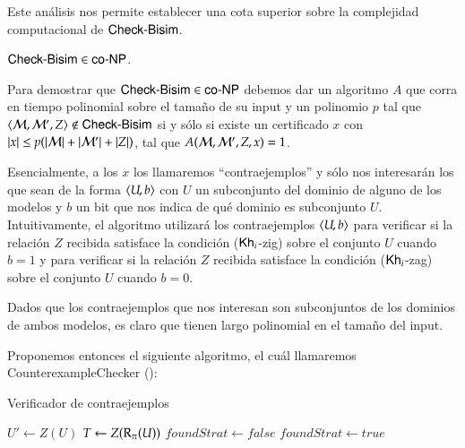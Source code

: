 Este análisis nos permite establecer una cota superior sobre la complejidad computacional de $\rm\textsf{Check-Bisim}$.

\begin{lema}\label{lema:cbisim-in-conp}
    $\rm\textsf{Check-Bisim} \in \rm\textsf{co-NP}$. 
\end{lema}

\begin{demostracion}
    Para demostrar que $\rm\textsf{Check-Bisim} \in \rm\textsf{co-NP}$ debemos dar un algoritmo $A$ que corra en tiempo polinomial sobre el tamaño de su input 
    y un polinomio $p$ tal que $\langle \mathcal{M},\mathcal{M}',Z \rangle \not\in \rm\textsf{Check-Bisim}$ si y sólo si existe un 
    certificado $x$ con $|x| \le p(|\mathcal{M}|+|\mathcal{M}'|+|Z|)$, tal que $A(\mathcal{M},\mathcal{M}',Z,x) = 1$. 
    
    Esencialmente, a los $x$ los llamaremos ``contraejemplos'' y sólo nos interesarán los que sean de la forma $\langle U,b \rangle$ con $U$ un 
    subconjunto del dominio de alguno de los modelos y $b$ un bit que nos indica de qué dominio es subconjunto $U$. 
    Intuitivamente, el algoritmo utilizará los contraejemplos $\langle U,b \rangle$ para verificar si la relación $Z$ recibida 
    satisface la condición ($\mathsf{Kh}_i$-zig) sobre el conjunto $U$ cuando $b = 1$ y para verificar si la 
    relación $Z$ recibida satisface la condición ($\mathsf{Kh}_i$-zag) sobre el conjunto $U$ cuando $b = 0$.

    Dados que los contraejemplos que nos interesan son subconjuntos de los dominios de ambos modelos, es claro 
    que tienen largo polinomial en el tamaño del input.

    Proponemos entonces el siguiente algoritmo, el cuál llamaremos \textsf{CounterexampleChecker} ():

    \begin{algorithm}
        \caption{Verificador de contraejemplos}
        \begin{algorithmic}[1]\label{alg:counter-example-checker}
                        \State $U' \gets Z(U)$
                        \State $T \gets Z(\mathrm{R}_\pi(U))$ 
                        \State $foundStrat \gets false$
                                    \State $foundStrat \gets true$
                                \EndIf         
                            \EndFor
                            \EndIf
                        \EndIf
                    \EndFor
                \EndFor
                \State {}
            \EndFunction


\end{algorithmic}
\end{algorithm}
\end{demostracion}

